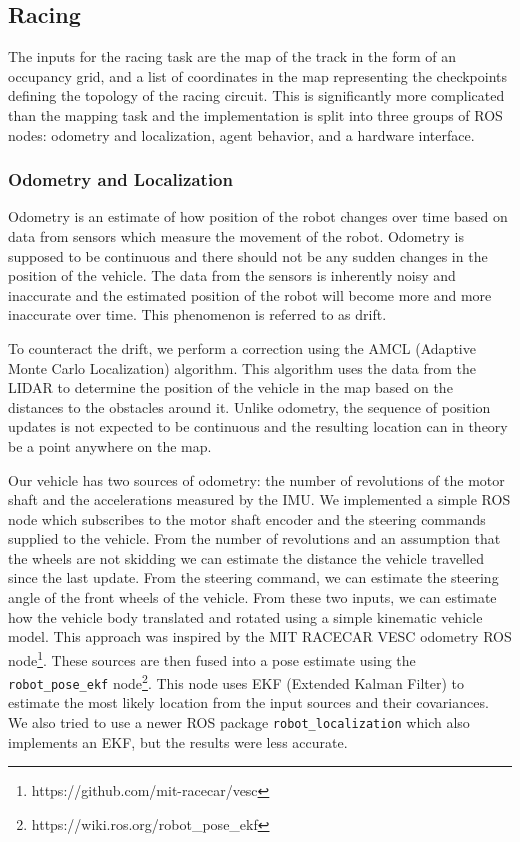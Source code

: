 \subsection{Racing}

The inputs for the racing task are the map of the track in the form of an occupancy grid, and a list of coordinates in the map representing the checkpoints defining the topology of the racing circuit. This is significantly more complicated than the mapping task and the implementation is split into three groups of ROS nodes: odometry and localization, agent behavior, and a hardware interface.

\subsubsection{Odometry and Localization}

Odometry is an estimate of how position of the robot changes over time based on data from sensors which measure the movement of the robot. Odometry is supposed to be continuous and there should not be any sudden changes in the position of the vehicle. The data from the sensors is inherently noisy and inaccurate and the estimated position of the robot will become more and more inaccurate over time. This phenomenon is referred to as drift.

To counteract the drift, we perform a correction using the AMCL (Adaptive Monte Carlo Localization) algorithm. This algorithm uses the data from the LIDAR to determine the position of the vehicle in the map based on the distances to the obstacles around it. Unlike odometry, the sequence of position updates is not expected to be continuous and the resulting location can in theory be a point anywhere on the map.

Our vehicle has two sources of odometry: the number of revolutions of the motor shaft and the accelerations measured by the IMU. We implemented a simple ROS node which subscribes to the motor shaft encoder and the steering commands supplied to the vehicle. From the number of revolutions and an assumption that the wheels are not skidding we can estimate the distance the vehicle travelled since the last update. From the steering command, we can estimate the steering angle of the front wheels of the vehicle. From these two inputs, we can estimate how the vehicle body translated and rotated using a simple kinematic vehicle model. This approach was inspired by the MIT RACECAR VESC odometry ROS node\footnote{https://github.com/mit-racecar/vesc}. These sources are then fused into a pose estimate using the \verb|robot_pose_ekf| node\footnote{https://wiki.ros.org/robot\_pose\_ekf}. This node uses EKF (Extended Kalman Filter) to estimate the most likely location from the input sources and their covariances. We also tried to use a newer ROS package \verb|robot_localization| which also implements an EKF, but the results were less accurate.


